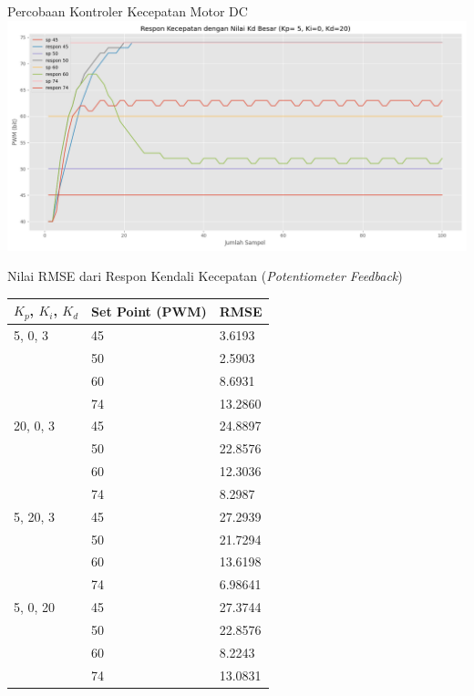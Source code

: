\documentclass[10pt,xcolor={dvipsnames}]{beamer}
\begin{document}
	\begin{frame}{Percobaan Kontroler Kecepatan Motor DC}
		\centering
		\includegraphics[width=14cm]{Graph/speedKdBesar.png}
	\end{frame}
	\begin{frame}{Nilai RMSE dari Respon Kendali Kecepatan (\textit{Potentiometer Feedback})}
		\begin{table}[H] 
			\begin{tabular}{| m{3cm} | m{3cm}| m{3cm}|}
				\hline
				\textbf{$K_{p}$, $K_{i}$, $K_{d}$}	& \textbf{Set Point (PWM)}	& \textbf{RMSE}\\
				\hline 
				5, 0, 3		& 45			& 3.6193\\
				& 50		& 2.5903\\
				& 60			& 8.6931\\
				& 74			& 13.2860\\
				\hline
				20, 0, 3	& 45			& 24.8897\\
				& 50			& 22.8576\\
				& 60			& 12.3036\\
				& 74			& 8.2987\\
				\hline
				5, 20, 3	& 45			& 27.2939\\
				& 50			& 21.7294\\
				& 60			& 13.6198\\
				& 74			& 6.98641\\
				\hline
				5, 0, 20	& 45			& 27.3744\\
				& 50			& 22.8576\\
				& 60			& 8.2243\\
				& 74			& 13.0831\\
				\hline
			\end{tabular}
		\end{table}
	\end{frame}
\end{document}
